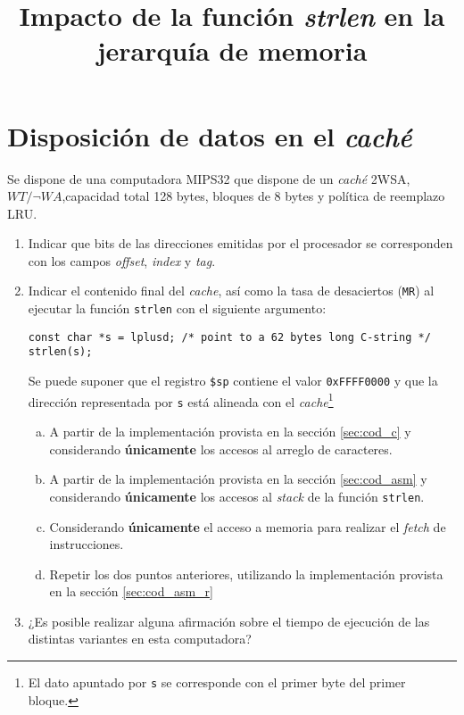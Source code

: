 \documentclass[a4paper]{article}
\title{Impacto de la función \textit{strlen} en la jerarquía de memoria}
\date{}
\begin{document}
\maketitle


\section{Disposición de datos en el \textit{caché}}
Se dispone de una computadora MIPS32 que dispone de un \textit{caché} 2WSA, $WT/\neg WA$,capacidad total 128 bytes,
bloques de 8 bytes y política de reemplazo LRU.

\begin{enumerate}

\item Indicar que bits de las direcciones emitidas por el procesador se corresponden con los campos \textit{offset}, \textit{index} y \textit{tag}.

\item Indicar el contenido final del \textit{cache}, así como la tasa de desaciertos (\texttt{MR}) al ejecutar la 
función \texttt{strlen} con el siguiente argumento:

\begin{lstlisting}
const char *s = lplusd; /* point to a 62 bytes long C-string */
strlen(s);
\end{lstlisting}
 
 Se puede suponer que el registro \texttt{\$sp} contiene el valor \texttt{0xFFFF0000} y que la dirección representada por \texttt{s} está alineada con el \textit{cache}\footnote{El dato apuntado por \texttt{s} se corresponde con el primer byte del primer bloque.}
\begin{enumerate}[a.]
  
  \item A partir de la implementación provista en la sección \ref{sec:cod_c} y considerando \textbf{únicamente} 
	los accesos al arreglo de caracteres.
 
  \item A partir de la implementación provista en la sección \ref{sec:cod_asm} y considerando \textbf{únicamente} 
	los accesos al \textit{stack} de la función \texttt{strlen}.
  
  \item Considerando \textbf{únicamente} el acceso a memoria para realizar el \textit{fetch} de instrucciones.


  \item Repetir los dos puntos anteriores, utilizando la implementación provista en la sección \ref{sec:cod_asm_r}
\end{enumerate}

\item ¿Es posible realizar alguna afirmación sobre el tiempo de ejecución de las distintas variantes en esta computadora?

\end{enumerate}
\end{document}
